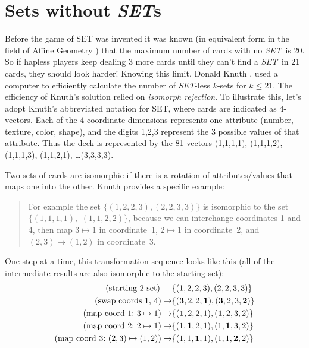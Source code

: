 \documentclass{article}
\newcommand{\SET}{{\em SET}}
\newcommand{\SETs}{{\em SET}s}
\begin{document}
\section{Sets without \SETs}
Before the game of SET was invented it was known (in equivalent form in the
field of Affine Geometry \cite{MAXCAP}) that the maximum number of cards with no
\SET~is 20. So if hapless players keep dealing 3 more cards until they can't
find a \SET~in 21 cards, they should look harder!  Knowing this limit, Donald
Knuth \cite{SETSET}, \cite{SETSET-ALL} used a computer to efficiently calculate
the number of \SET-less $k$-sets for $k\leq 21$. The efficiency of Knuth's
solution relied on {\em isomorph rejection}. To illustrate this, let's adopt
Knuth's abbreviated notation for SET, where cards are indicated as
4-vectors. Each of the 4 coordinate dimensions represents one attribute (number,
texture, color, shape), and the digits 1,2,3 represent the 3 possible values of
that attribute. Thus the deck is represented by the 81 vectors (1,1,1,1),
(1,1,1,2), (1,1,1,3), (1,1,2,1), \ldots (3,3,3,3).

Two sets of cards are isomorphic if there is a rotation of attributes/values
that maps one into the other. Knuth provides a specific example:
\begin{quotation}For example the set $\{(1,2,2,3), (2,2,3,3)\}$ is
  isomorphic to the set $\{(1,1,1,1),$ $(1,1,2,2)\}$, because we can interchange
  coordinates 1 and 4, then map $3\mapsto 1$ in coordinate~1, $2\mapsto1$ in
  coordinate~2, and $(2,3)\mapsto(1,2)$ in coordinate~3.
\end{quotation}
One step at a time, this transformation sequence looks like this (all of the
intermediate results are also isomorphic to the starting set):
\begin{align*}
(\text{starting 2-set)\hspace{5mm}}&  \{(1,2,2,3), (2,2,3,3)\}  \\
  (\text{swap coords 1, 4})  \rightarrow & \{(\mathbf{3},2,2,\mathbf{1}), (\mathbf{3},2,3,\mathbf{2})\} \\
  (\text{map coord 1:~} 3\mapsto 1)\rightarrow & \{(\mathbf{1},2,2,1), (\mathbf{1},2,3,2)\} \\
  (\text{map coord 2:~} 2\mapsto 1)\rightarrow & \{(1,\mathbf{1},2,1), (1,\mathbf{1},3,2)\} \\
  (\text{map coord 3:~} (2,3)\mapsto(1,2))\rightarrow & \{(1,1,\mathbf{1},1), (1,1,\mathbf{2},2)\}
\end{align*}
\end{document}
